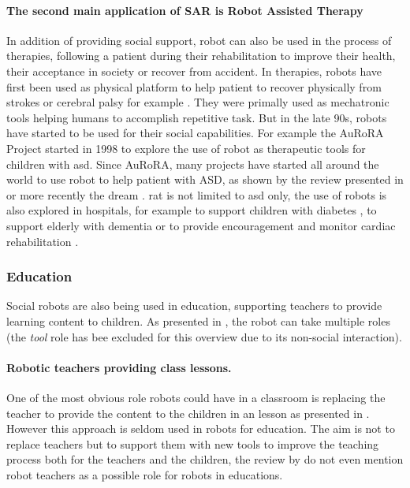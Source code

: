 	\paragraph{The second main application of SAR is Robot Assisted Therapy}
    In addition of providing social support, robot can also be used in the process of therapies, following a patient during their rehabilitation to improve their health, their acceptance in society or recover from accident.
    In therapies, robots have first been used as physical platform to help
    patient to recover physically from strokes or cerebral palsy for example
    \citep{sivan2011systematic}. They were primally used as mechatronic tools
    helping humans to accomplish repetitive task. But in the late 90s,
    robots have started to be used for their social capabilities. For example the
    AuRoRA Project \citep{dautenhahn1999robots}
    started in 1998 to explore the use of robot as therapeutic tools for
    children with \gls{asd}.
    Since AuRoRA, many projects have started all around the world to use robot
    to help patient with ASD, as shown by the review presented in
    \citep{diehl2012clinical} or more recently the \gls{dream} \citep{esteban2017build}. \gls{rat} is not limited to \gls{asd} only, the use of robots
    is also explored in hospitals, for example to support children with diabetes
    \citep{belpaeme2012multimodal}, to support elderly with dementia
    \citep{wada2005psychological} or to provide encouragement and monitor cardiac rehabilitation \citep{lara2017human}.	
	
\subsubsection{Education} 
	Social robots are also being used in education, supporting teachers to provide learning content to children. As presented in \cite{mubin2013review}, the robot can take multiple roles (the \emph{tool} role has bee excluded for this overview due to its non-social interaction).
	
	\paragraph{Robotic teachers providing class lessons.} 
	One of the most obvious role robots could have in a classroom is replacing the teacher to provide the content to the children in an lesson as presented in \cite{verner2016science}. However this approach is seldom used in robots for education. The aim is not to replace teachers but to support them with new tools to improve the teaching process both for the teachers and the children, the review by \cite{mubin2013review} do not even mention robot teachers as a possible role for robots in educations. 
	
